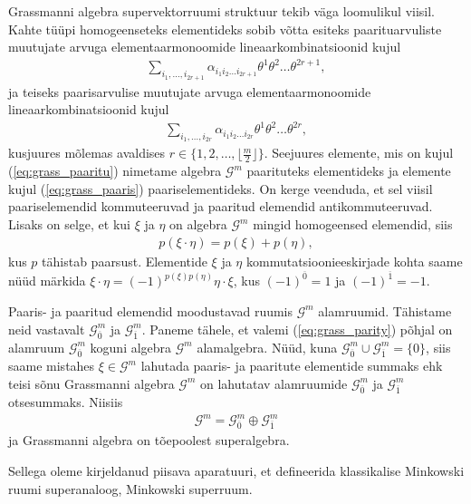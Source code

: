 \documentclass[12pt,a4paper,oneside]{article}
\theoremstyle{plain}
\theoremstyle{definition}
\numberwithin{equation}{section}
\def\G{{\mathcal G}}
\begin{document}
Grassmanni algebra supervektorruumi struktuur tekib väga loomulikul 
viisil. Kahte tüüpi homogeenseteks elementideks sobib võtta
esiteks paarituarvuliste muutujate arvuga elementaarmonoomide 
lineaarkombinatsioonid kujul
\begin{align} \label{eq:grass_paaritu}
\sum_{i_1, \ldots, i_{2r+1}} \alpha_{i_1 i_2 \ldots i_{2r+1}} 
\theta^1 \theta^2 \ldots \theta^{2r+1},
\end{align}
ja teiseks paarisarvulise muutujate arvuga elementaarmonoomide 
lineaarkombinatsioonid kujul
\begin{align} \label{eq:grass_paaris}
\sum_{i_1, \ldots, i_{2r}} \alpha_{i_1 i_2 \ldots i_{2r}} 
\theta^1 \theta^2 \ldots \theta^{2r},
\end{align}
kusjuures mõlemas avaldises $r \in \{1, 2, \ldots, 
\lfloor \frac{m}{2} \rfloor \}$. Seejuures elemente, mis on kujul 
(\ref{eq:grass_paaritu}) nimetame algebra $\G^m$ paarituteks 
elementideks ja elemente kujul (\ref{eq:grass_paaris}) 
paaris\-elementideks. On kerge veenduda, et sel viisil 
paariselemendid kommuteeruvad ja paaritud elemendid 
antikommuteeruvad. Lisaks on selge, et kui $\xi$ ja $\eta$ on 
algebra $\G^m$ mingid homogeensed elemendid, siis 
\begin{align} \label{eq:grass_parity}
p \left(\xi \cdot \eta \right) = p \left(\xi\right) 
+ p \left(\eta \right),
\end{align}
kus $p$ tähistab paarsust. Elementide $\xi$ ja $\eta$ 
kommutatsioonieeskirjade kohta saame nüüd 
märkida $\xi \cdot \eta = \left(-1\right)^{p\left(\xi\right) 
p\left(\eta\right)} \eta \cdot \xi$, kus 
$\left(-1\right)^{\overline{0}} = 1$ ja 
$\left(-1\right)^{\overline{1}} = -1$.

Paaris- ja paaritud elemendid moodustavad ruumis $\G^m$ alamruumid. 
Tähistame neid vastavalt $\G^{m}_{\overline{0}}$ ja 
$\G^{m}_{\overline{1}}$. Paneme tähele, et valemi
(\ref{eq:grass_parity}) põhjal on alamruum $\G^{m}_{\overline{0}}$ 
koguni algebra $\G^m$ alamalgebra. Nüüd, kuna 
$\G^{m}_{\overline{0}} \cup \G^{m}_{\overline{1}} = \{0\}$, siis 
saame mistahes $\xi \in \G^m$ lahutada paaris- ja paaritute 
elementide summaks ehk teisi sõnu Grassmanni algebra $\G^m$ on 
lahutatav alamruumide $\G^{m}_{\overline{0}}$ ja 
$\G^{m}_{\overline{1}}$ otsesummaks. Niisiis 
\begin{align*}
\G^m = \G^{m}_{\overline{0}} \oplus \G^{m}_{\overline{1}}
\end{align*}
ja Grassmanni algebra on tõepoolest superalgebra.

Sellega oleme kirjeldanud piisava aparatuuri, et defineerida
klassikalise Minkowski ruumi superanaloog, Minkowski superruum. 
\end{document}

